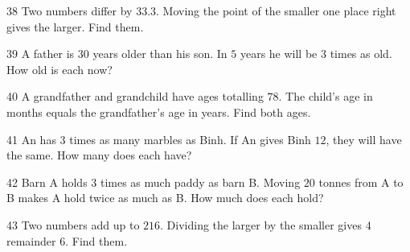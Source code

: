 \begin{probbox}{38}{}
Two numbers differ by $33.3$. Moving the point of the smaller one place right gives the larger. Find them.
\end{probbox}
\gap
\begin{probbox}{39}{}
A father is $30$ years older than his son. In $5$ years he will be $3$ times as old. How old is each now?
\end{probbox}
\gap
\begin{probbox}{40}{}
A grandfather and grandchild have ages totalling $78$. The child's age in months equals the grandfather's age in years. Find both ages.
\end{probbox}
\gap
\begin{probbox}{41}{}
An has $3$ times as many marbles as Binh. If An gives Binh $12$, they will have the same. How many does each have?
\end{probbox}
\gap
\begin{probbox}{42}{}
Barn A holds $3$ times as much paddy as barn B. Moving $20$ tonnes from A to B makes A hold twice as much as B. How much does each hold?
\end{probbox}
\gap
\begin{probbox}{43}{}
Two numbers add up to $216$. Dividing the larger by the smaller gives $4$ remainder $6$. Find them.
\end{probbox}
